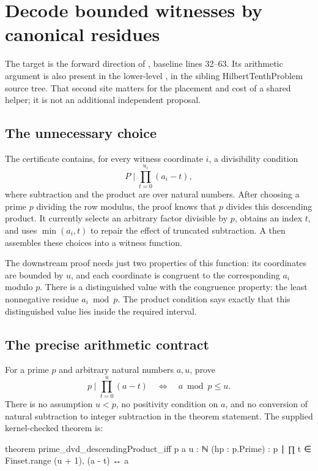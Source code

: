 \section{Decode bounded witnesses by canonical residues}
\label{sec:residue}
The target is the forward direction of , baseline lines 32--63. Its arithmetic argument is also present in the lower-level , in the sibling HilbertTenthProblem source tree. That second site matters for the placement and cost of a shared helper; it is not an additional independent proposal.

\subsection{The unnecessary choice}
The certificate contains, for every witness coordinate $i$, a divisibility condition
\[
 P\mid\prod_{t=0}^{u_i}(a_i-t),
\]
where subtraction and the product are over natural numbers. After choosing a prime $p$ dividing the row modulus, the proof knows that $p$ divides this descending product. It currently selects an arbitrary factor divisible by $p$, obtains an index $t$, and uses $\min(a_i,t)$ to repair the effect of truncated subtraction. A  then assembles these choices into a witness function.

The downstream proof needs just two properties of this function: its coordinates are bounded by $u$, and each coordinate is congruent to the corresponding $a_i$ modulo $p$. There is a distinguished value with the congruence property: the least nonnegative residue $a_i\bmod p$. The product condition says exactly that this distinguished value lies inside the required interval.

\subsection{The precise arithmetic contract}
For a prime $p$ and arbitrary natural numbers $a,u$, prove
\begin{equation}
\label{eq:residue}
p\mid\prod_{t=0}^{u}(a-t)
\quad\Longleftrightarrow\quad
 a\bmod p\le u.
\end{equation}
There is no assumption $u<p$, no positivity condition on $a$, and no conversion of natural subtraction to integer subtraction in the theorem statement. The supplied kernel-checked theorem is:
\begin{lean}
theorem prime_dvd_descendingProduct_iff {p a u : ℕ}
    (hp : p.Prime) :
    p ∣ ∏ t ∈ Finset.range (u + 1), (a - t) ↔
      a %
\end{lean}

